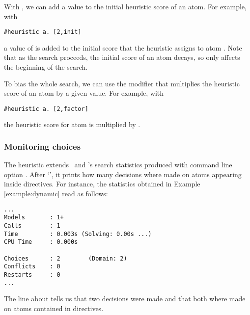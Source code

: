 With , we can add a value to the initial heuristic score of an atom.
For example, with
\begin{lstlisting}[numbers=none]
#heuristic a. [2,init]
\end{lstlisting}
a value of  is added to
the initial score that the heuristic assigns to atom .
Note that as the search proceeds, the initial score of an atom decays, 
so  only affects the beginning of the search.

To bias the whole search, we can use the  modifier
that multiplies the heuristic score of an atom by a given value.
For example, with 
\begin{lstlisting}[numbers=none]
#heuristic a. [2,factor]
\end{lstlisting}
the heuristic score for atom  is multiplied by .

\subsubsection{Monitoring  choices}

The  heuristic extends \clasp\ and \clingo's search statistics produced with command line option .
After `', it prints how many decisions where made on atoms appearing inside  directives.
%
For instance, the statistics obtained in Example \ref{example:dynamic} read as follows:
\begin{lstlisting}[numbers=none]
...
Models       : 1+
Calls        : 1
Time         : 0.003s (Solving: 0.00s ...)
CPU Time     : 0.000s

Choices      : 2        (Domain: 2)
Conflicts    : 0        
Restarts     : 0
...
\end{lstlisting}
The line about  tells us that two decisions were made 
and that both where made on atoms contained in  directives.

